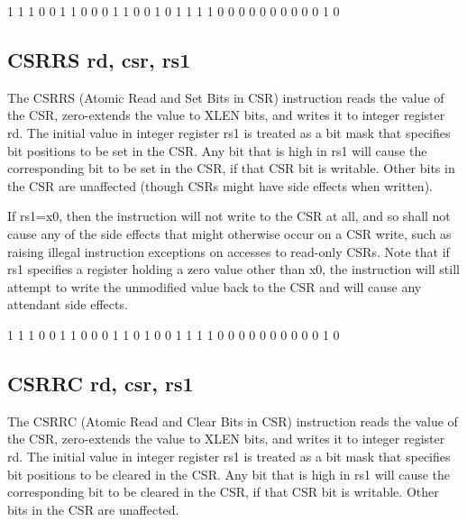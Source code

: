{1 1 1 0 0 1 1}				%
{0 0 0 1 1}					%
{0 0 1}						%
{0 1 1 1 1}					%
{0 0 0 0 0 0 0 0 0 0 1 0}	%

\subsection{CSRRS rd, csr, rs1}

The CSRRS (Atomic Read and Set Bits in CSR) instruction reads the value 
of the CSR, zero-extends the value to XLEN bits, and writes it to integer 
register rd. The initial value in integer register rs1 is treated as a bit 
mask that specifies bit positions to be set in the CSR. Any bit that
is high in rs1 will cause the corresponding bit to be set in the CSR, 
if that CSR bit is writable.  Other bits in the CSR are unaffected (though 
CSRs might have side effects when written).~\cite[p.~22]{rvismv1v22:2017}

If rs1=x0, then the instruction will not write 
to the CSR at all, and so shall not cause any of the side effects that 
might otherwise occur on a CSR write, such as raising illegal instruction 
exceptions on accesses to read-only CSRs. Note that if rs1 specifies a 
register holding a zero value other than x0, the instruction will still 
attempt to write the unmodified value back to the CSR and will cause any 
attendant side effects.~\cite[p.~22]{rvismv1v22:2017}


{1 1 1 0 0 1 1}				%
{0 0 0 1 1}					%
{0 1 0}						%
{0 1 1 1 1}					%
{0 0 0 0 0 0 0 0 0 0 1 0}	%

\subsection{CSRRC rd, csr, rs1}

The CSRRC (Atomic Read and Clear Bits in CSR) instruction reads the value 
of the CSR, zero-extends the value to XLEN bits, and writes it to integer 
register rd. The initial value in integer register rs1 is treated as a 
bit mask that specifies bit positions to be cleared in the CSR. Any bit
that is high in rs1 will cause the corresponding bit to be cleared in 
the CSR, if that CSR bit is writable. Other bits in the CSR are 
unaffected.~\cite[p.~22]{rvismv1v22:2017}

